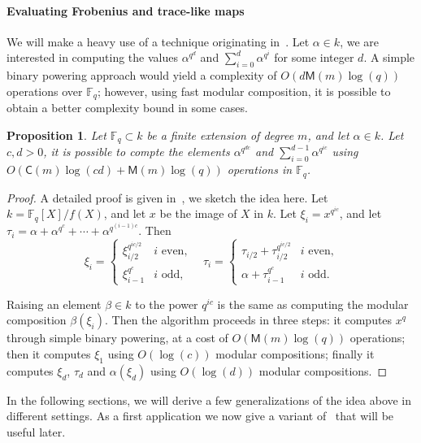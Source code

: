 \documentclass[12pt]{article}
\theoremstyle{plain}
\newtheorem{proposition}[theorem]{Proposition}
\theoremstyle{definition}
\def\F{\ensuremath{\mathbb{F}}}
\def\MM{\ensuremath{\mathsf{M}}}
\def\CC{\ensuremath{\mathsf{C}}}
\newcounter{algorithm}
\begin{document}
\paragraph{Evaluating Frobenius and trace-like maps}

We will make a heavy use of a technique originating
in~\cite{von1992computing}. Let $\alpha\in k$, we are interested in
computing the values $\alpha^{q^d}$ and $\sum_{i=0}^d \alpha^{q^i}$
for some integer $d$. A simple binary powering approach would yield a
complexity of $O(d\MM(m)\log(q))$ operations over $\F_q$; however,
using fast modular composition, it is possible to obtain a better
complexity bound in some cases.

\begin{proposition}
  \label{prop:trace-like}
  Let $\F_q \subset k$ be a finite extension of degree $m$, and let
  $\alpha\in k$. Let $c,d>0$, it is possible to compte the elements
  $\alpha^{q^{dc}}$ and $\sum_{i=0}^{d-1}\alpha^{q^{ic}}$ using
  $O(\CC(m)\log(cd)+\MM(m)\log(q))$ operations in $\F_q$.
\end{proposition}
\begin{proof}
  A detailed proof is given in~\cite[Lemma~5.3]{von1992computing}, we
  sketch the idea here. Let $k=\F_q[X]/f(X)$, and let $x$ be the image
  of $X$ in $k$. Let $\xi_i = x^{q^{ic}}$, and let
  $\tau_i = \alpha + \alpha^{q^c} + \cdots + \alpha^{q^{(i -
      1)c}}$. Then
  \[
    \xi_i = 
    \begin{cases}
      \xi_{i / 2}^{q^{ic / 2}} & i \text{ even,} \\
      \xi_{i - 1}^{q^c} & i \text{ odd,}
    \end{cases} \quad
    \tau_i = 
    \begin{cases}
      \tau_{i / 2} + \tau_{i / 2}^{q^{ic/2}} & i \text{ even,} \\
      \alpha + \tau_{i - 1}^{q^c} & i \text{ odd.}
    \end{cases}
  \]

  Raising an element $\beta \in k$ to the power $q^{ic}$ is the same
  as computing the modular composition $\beta(\xi_i)$. Then the
  algorithm proceeds in three steps: it computes $x^q$ through simple
  binary powering, at a cost of $O(\MM(m)\log(q))$ operations; then it
  computes $\xi_1$ using $O(\log(c))$ modular compositions; finally it
  computes $\xi_d$, $\tau_d$ and $\alpha(\xi_d)$ using $O(\log(d))$
  modular compositions.
\end{proof}

In the following sections, we will derive a few generalizations of the
idea above in different settings. As a first application we now give a
variant of~\cite[Lemma~14]{shoup94} that will be useful later.
\end{document}
